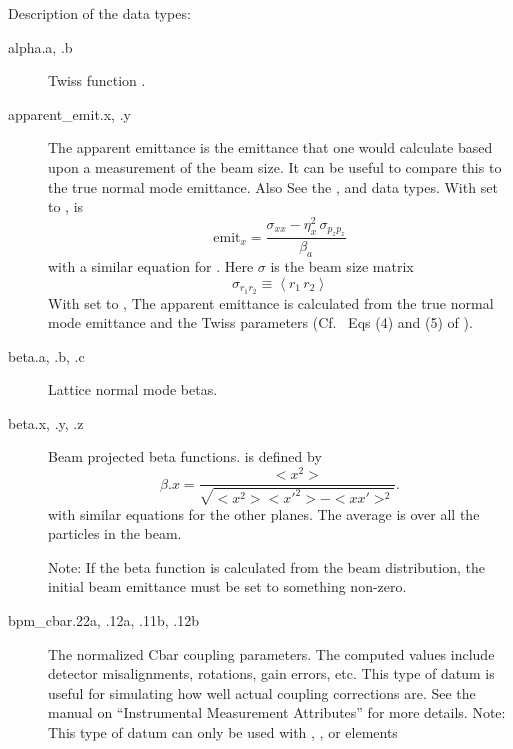 Description of the data types:

  \begin{description}
  \item[alpha.a, .b] \Newline {}
Twiss function .
  \item[apparent_emit.x, .y] \Newline {}
The apparent emittance is the emittance that one would calculate based
upon a measurement of the beam size\cite{b:emit}. It can be useful to
compare this to the true normal mode emittance. Also See the
,  and  data types.
With  set to ,  is
\begin{equation}
  \text{emit}_x = \frac{\sigma_{xx} - \eta_x^2 \, \sigma_{p_zp_z}}{\beta_a}
\end{equation}
with a similar equation for . Here $\sigma$ is the beam size matrix
\begin{equation}
  \sigma_{r_1r_2} \equiv \left< r_1 \, r_2 \right>
\end{equation}
With  set to , The apparent emittance is
calculated from the true normal mode emittance and the Twiss
parameters (Cf.~ Eqs (4) and (5) of \cite{b:emit}).

  \item[beta.a, .b, .c] \Newline {}
Lattice normal mode betas.

  \item[beta.x, .y, .z] \Newline {}
Beam projected beta functions.  is defined by
\begin{equation}
  \beta.x = \frac{<x^{2}>}{\sqrt{<x^{2}> <x'^{2}> - <x x'>^{2}}}.
\end{equation}
with similar equations for the other planes.
The average \vn{<>} is over all the particles in the beam.

Note: If the beta function is calculated from the beam distribution,
the initial beam emittance must be set to something non-zero.

  \item[bpm_cbar.22a, .12a, .11b, .12b] \Newline {}
The normalized Cbar coupling parameters. The computed  values include detector
misalignments, rotations, gain errors, etc. This type of datum is useful for simulating how well
actual coupling corrections are. See the \bmad manual on ``Instrumental Measurement Attributes'' for
more details.  Note: This type of datum can only be used with , ,
 or  elements


\end{description}
